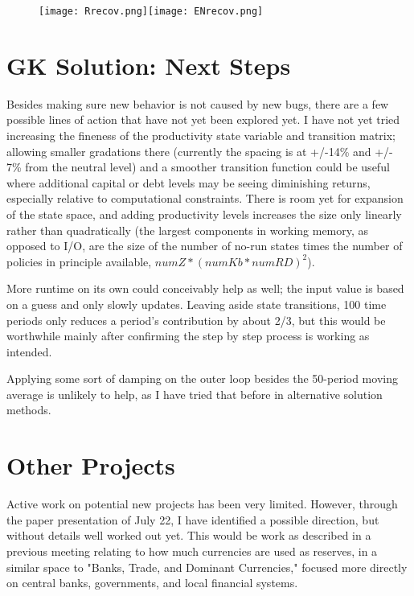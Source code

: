 \documentclass[english]{article}
\begin{document}
\begin{figure}[H]
\centering
		\texttt{[image: Rrecov.png]}\texttt{[image: ENrecov.png]}
\end{figure}

\section{GK Solution: Next Steps}
Besides making sure new behavior is not caused by new bugs, there are a few possible lines of action 
that have not yet been explored yet. I have not yet tried increasing the fineness of the productivity 
state variable and transition matrix; allowing smaller gradations there (currently the spacing is at +/-14\%
 and +/- 7\% from the neutral level) and a smoother transition function could be useful where additional 
capital or debt levels may be seeing diminishing returns, especially relative to computational constraints. 
There is room yet for expansion of the state space, and adding productivity levels increases the size 
only linearly rather than quadratically (the largest components in working memory, as opposed to I/O, 
are the size of the number of no-run states times the number of policies in principle available, 
$numZ*(numKb*numRD)^2$). 

More runtime on its own could conceivably help as well; the input value is based on a guess and only 
slowly updates. Leaving aside state transitions, 100 time periods only reduces a period's contribution 
by about 2/3, but this would be worthwhile mainly after confirming the step by step process is working as 
intended.

Applying some sort of damping on the outer loop besides the 50-period moving average is unlikely to 
help, as I have tried that before in alternative solution methods. 

\section{Other Projects}
Active work on potential new projects has been very limited. However, through the paper presentation of 
July 22, I have identified a possible direction, but without details well worked out yet. This would be work as described in a previous meeting 
relating to how much currencies are used as reserves, in a similar space to "Banks, Trade, and Dominant Currencies," 
focused more directly on central banks, governments, and local financial systems. 
\end{document}
